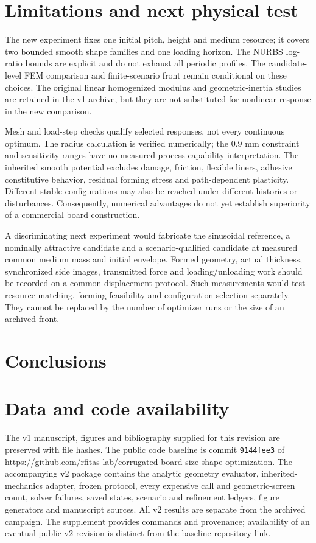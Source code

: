 \documentclass[10pt,twocolumn]{article}
\begin{document}
\section{Limitations and next physical test}
The new experiment fixes one initial pitch, height and medium resource; it covers two bounded smooth shape families and one loading horizon. The NURBS log-ratio bounds are explicit and do not exhaust all periodic profiles. The candidate-level FEM comparison and finite-scenario front remain conditional on these choices. The original linear homogenized modulus and geometric-inertia studies are retained in the v1 archive, but they are not substituted for nonlinear response in the new comparison.

Mesh and load-step checks qualify selected responses, not every continuous optimum. The radius calculation is verified numerically; the 0.9 mm constraint and sensitivity ranges have no measured process-capability interpretation. The inherited smooth potential excludes damage, friction, flexible liners, adhesive constitutive behavior, residual forming stress and path-dependent plasticity. Different stable configurations may also be reached under different histories or disturbances. Consequently, numerical advantages do not yet establish superiority of a commercial board construction.

A discriminating next experiment would fabricate the sinusoidal reference, a nominally attractive candidate and a scenario-qualified candidate at measured common medium mass and initial envelope. Formed geometry, actual thickness, synchronized side images, transmitted force and loading/unloading work should be recorded on a common displacement protocol. Such measurements would test resource matching, forming feasibility and configuration selection separately. They cannot be replaced by the number of optimizer runs or the size of an archived front.

\section{Conclusions}


\section*{Data and code availability}
The v1 manuscript, figures and bibliography supplied for this revision are preserved with file hashes. The public code baseline is commit \texttt{9144fee3} of \url{https://github.com/rfitas-lab/corrugated-board-size-shape-optimization}. The accompanying v2 package contains the analytic geometry evaluator, inherited-mechanics adapter, frozen protocol, every expensive call and geometric-screen count, solver failures, saved states, scenario and refinement ledgers, figure generators and manuscript sources. All v2 results are separate from the archived campaign. The supplement provides commands and provenance; availability of an eventual public v2 revision is distinct from the baseline repository link.
\end{document}
